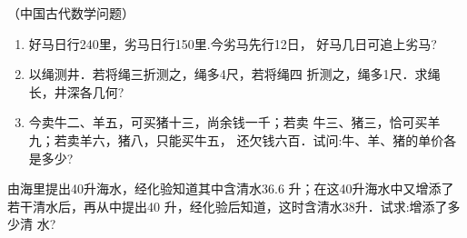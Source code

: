 \begin{enumerate}
\staritem （中国古代数学问题）
\begin{enumerate}
    \item 好马日行240里，劣马日行150里.今劣马先行12日，
    好马几日可追上劣马?
    \item 以绳测井．若将绳三折测之，绳多4尺，若将绳四
    折测之，绳多1尺．求绳长，井深各几何?
    \item 今卖牛二、羊五，可买猪十三，尚余钱一千；若卖
      牛三、猪三，恰可买羊九；若卖羊六，猪八，只能买牛五，
      还欠钱六百．试问:牛、羊、猪的单价各是多少?
\end{enumerate}


  \staritem 由海里提出40升海水，经化验知道其中含清水36.6
升；在这40升海水中又增添了若干清水后，再从中提出40
升，经化验后知道，这时含清水38升．试求:增添了多少清
  水?

\end{enumerate}

